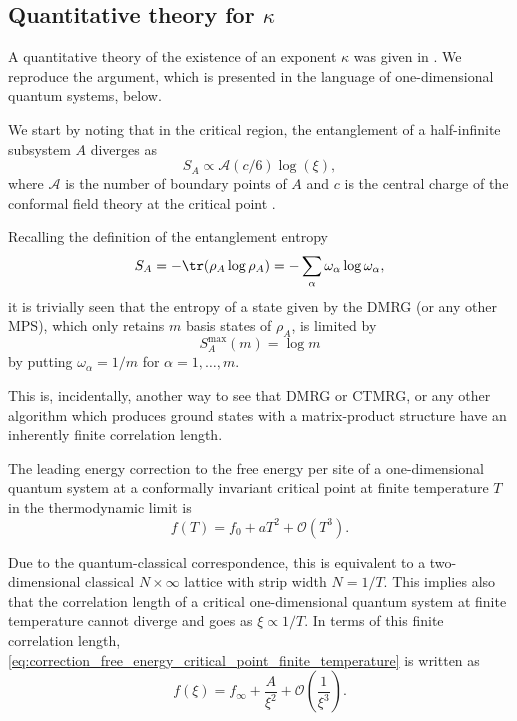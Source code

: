 \subsection{Quantitative theory for $\kappa$}
A quantitative theory of the existence of an exponent $\kappa$ was given in \cite{pollmann2009theory}.
We reproduce the argument, which is presented in the language of one-dimensional quantum systems, below.

We start by noting that in the critical region, the entanglement of a half-infinite subsystem $A$ diverges as
\begin{equation}\label{eq:entropy_scaling_near_criticality}
  S_A \propto \mathcal{A}(c/6)\log(\xi),
\end{equation}
where $\mathcal{A}$ is the number of boundary points of $A$ and $c$ is the central charge of the conformal field theory
at the critical point \cite{calabrese2004entanglement, vidal2003entanglement, ercolessi2010exact}.

Recalling the definition of the entanglement entropy
\begin{equation}
  S_A = - \tr(\rho_A \log \rho_A) = - \sum_{\alpha} \omega_{\alpha} \log \omega_{\alpha},
\end{equation}
it is trivially seen that the entropy of a state given by the DMRG (or any other MPS), which only
retains $m$ basis states of $\rho_A$, is limited by
\begin{equation}
  S^{\text{max}}_A(m) = \log m
\end{equation}
by putting $\omega_{\alpha} = 1/m$ for $\alpha = 1, \dots, m$.

This is, incidentally, another way to see that DMRG or CTMRG, or any other algorithm which produces ground states with a
matrix-product structure have an inherently finite correlation length.

The leading energy correction to the free energy per site of a one-dimensional quantum system at a conformally invariant
critical point at finite temperature $T$ in the thermodynamic limit is \cite{affleck1986universal}
\begin{equation}\label{eq:correction_free_energy_critical_point_finite_temperature}
  f(T) = f_0 + aT^2 + \mathcal{O}(T^3).
\end{equation}

Due to the quantum-classical correspondence, this is equivalent to a two-dimensional classical $N \times \infty$ lattice
with strip width $N = 1/T$.
This implies also that the correlation length of a critical one-dimensional quantum system at finite temperature cannot
diverge and goes as $\xi \propto 1/T$.
In terms of this finite correlation length, \autoref{eq:correction_free_energy_critical_point_finite_temperature} is
written as
\begin{equation}\label{eq:correction_free_energy_critical_point_finite_correlation_length}
  f(\xi) = f_{\infty} + \frac{A}{\xi^2} + \mathcal{O(\frac{1}{\xi^3})}.
\end{equation}

